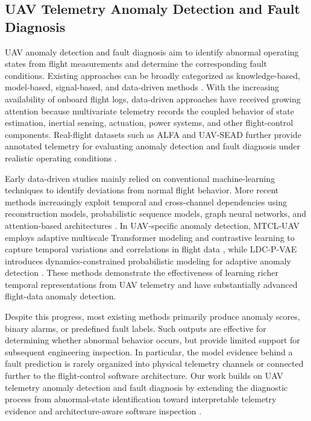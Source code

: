\subsection{UAV Telemetry Anomaly Detection and Fault Diagnosis}

UAV anomaly detection and fault diagnosis aim to identify abnormal operating states from flight measurements and determine the corresponding fault conditions. Existing approaches can be broadly categorized as knowledge-based, model-based, signal-based, and data-driven methods \cite{fourlas2021survey,puchalski2022uav,adaika2025fdd}. With the increasing availability of onboard flight logs, data-driven approaches have received growing attention because multivariate telemetry records the coupled behavior of state estimation, inertial sensing, actuation, power systems, and other flight-control components. Real-flight datasets such as ALFA and UAV-SEAD further provide annotated telemetry for evaluating anomaly detection and fault diagnosis under realistic operating conditions \cite{keipour2021alfa,kabaoglu2026uavsead,keipour2019automatic}.

Early data-driven studies mainly relied on conventional machine-learning techniques to identify deviations from normal flight behavior. More recent methods increasingly exploit temporal and cross-channel dependencies using reconstruction models, probabilistic sequence models, graph neural networks, and attention-based architectures \cite{zhang2019mscred,su2019omnianomaly,deng2021gdn,tuli2022tranad,xu2022anomaly}. In UAV-specific anomaly detection, MTCL-UAV employs adaptive multiscale Transformer modeling and contrastive learning to capture temporal variations and correlations in flight data \cite{hu2025mtcl}, while LDC-P-VAE introduces dynamics-constrained probabilistic modeling for adaptive anomaly detection \cite{yang2026ldcpvae}. These methods demonstrate the effectiveness of learning richer temporal representations from UAV telemetry and have substantially advanced flight-data anomaly detection.

Despite this progress, most existing methods primarily produce anomaly scores, binary alarms, or predefined fault labels. Such outputs are effective for determining whether abnormal behavior occurs, but provide limited support for subsequent engineering inspection. In particular, the model evidence behind a fault prediction is rarely organized into physical telemetry channels or connected further to the flight-control software architecture. Our work builds on UAV telemetry anomaly detection and fault diagnosis by extending the diagnostic process from abnormal-state identification toward interpretable telemetry evidence and architecture-aware software inspection \cite{lundberg2017shap,lundberg2020trees,meier2015px4,px4uorbdocs2026}.
